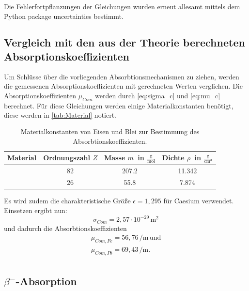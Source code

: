 Die Fehlerfortpflanzungen der Gleichungen wurden erneut allesamt mittels dem Python package 
uncertainties bestimmt. \cite{unc}

\subsection{Vergleich mit den aus der Theorie berechneten Absorptionskoeffizienten}

Um Schlüsse über die vorliegenden Absorbtionsmechanismen zu ziehen, werden die gemessenen Absorptionskoeffizienten
mit gerechneten Werten verglichen. Die Absorptionskoeffizienten $\mu_{Com}$ werden durch \autoref{eq:sigma_c} und
\autoref{eq:mu_c} berechnet.
Für diese Gleichungen werden einige Materialkonstanten benötigt, diese werden in \autoref{tab:Material} notiert.
\begin{table}
  \centering
  \begin{tabular}{S S[table-format=2.0] S[table-format=3.1] S[table-format=2.3]}
    \toprule
    {Material} & {Ordnungszahl $Z$} & {Masse $m\:$ in $\frac{\si\gram}{\si\mol}$} & {Dichte $\rho\:$ in $\frac{\si\gram}{\si{\centi\meter}^3}$}\\
    \midrule
     & 82 & 207.2 & 11.342\\
     &26 & 55.8  & 7.874\\
    \bottomrule
  \end{tabular}
  \caption{Materialkonstanten von Eisen und Blei zur Bestimmung des Absorbtionskoeffizienten.}
  \label{tab:Material}
\end{table}
Es wird zudem die charakteristische Größe $\epsilon = 1,295$ für Caesium verwendet.
Einsetzen ergibt nun:
\begin{equation*}
  \sigma_{Com} = 2,57 \cdot 10^{-29} \, \mathrm{m}^2
\end{equation*}
und dadurch die Absorbtionskoeffizienten
\begin{align*}
  \mu_{Com,Fe} = 56,76 \, \si{\per\meter} \, \mathrm{und} \\
  \mu_{Com,Pb} = 69,43 \, \si{\per\meter}. \\
\end{align*}

\subsection{\texorpdfstring{$\beta^-$}{Beta}-Absorption}

